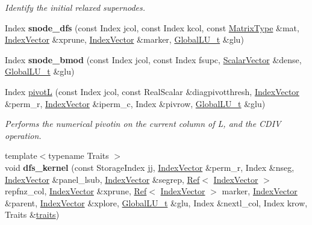 \begin{DoxyCompactItemize}
\begin{DoxyCompactList}\small\item\em Identify the initial relaxed supernodes. \end{DoxyCompactList}\item 
\mbox{\label{class_eigen_1_1internal_1_1_sparse_l_u_impl_a75c5a4b5a17643e243e11741df018470}} 
Index {\bfseries snode\+\_\+dfs} (const Index jcol, const Index kcol, const \mbox{\hyperlink{class_eigen_1_1_sparse_matrix}{Matrix\+Type}} \&mat, \mbox{\hyperlink{class_eigen_1_1_matrix}{Index\+Vector}} \&xprune, \mbox{\hyperlink{class_eigen_1_1_matrix}{Index\+Vector}} \&marker, \mbox{\hyperlink{struct_eigen_1_1internal_1_1_l_u___global_l_u__t}{Global\+L\+U\+\_\+t}} \&glu)
\item 
\mbox{\label{class_eigen_1_1internal_1_1_sparse_l_u_impl_a2d835179cc3dcf09ff14ab3c8f0d9415}} 
Index {\bfseries snode\+\_\+bmod} (const Index jcol, const Index fsupc, \mbox{\hyperlink{class_eigen_1_1_matrix}{Scalar\+Vector}} \&dense, \mbox{\hyperlink{struct_eigen_1_1internal_1_1_l_u___global_l_u__t}{Global\+L\+U\+\_\+t}} \&glu)
\item 
Index \mbox{\hyperlink{class_eigen_1_1internal_1_1_sparse_l_u_impl_ab5f56947465b829f8d523575724c3ac6}{pivotL}} (const Index jcol, const Real\+Scalar \&diagpivotthresh, \mbox{\hyperlink{class_eigen_1_1_matrix}{Index\+Vector}} \&perm\+\_\+r, \mbox{\hyperlink{class_eigen_1_1_matrix}{Index\+Vector}} \&iperm\+\_\+c, Index \&pivrow, \mbox{\hyperlink{struct_eigen_1_1internal_1_1_l_u___global_l_u__t}{Global\+L\+U\+\_\+t}} \&glu)
\begin{DoxyCompactList}\small\item\em Performs the numerical pivotin on the current column of L, and the C\+D\+IV operation. \end{DoxyCompactList}\item 
\mbox{\label{class_eigen_1_1internal_1_1_sparse_l_u_impl_aef49b896c596d9e4893d3ae468d1dfac}} 
{\footnotesize template$<$typename Traits $>$ }\\void {\bfseries dfs\+\_\+kernel} (const Storage\+Index jj, \mbox{\hyperlink{class_eigen_1_1_matrix}{Index\+Vector}} \&perm\+\_\+r, Index \&nseg, \mbox{\hyperlink{class_eigen_1_1_matrix}{Index\+Vector}} \&panel\+\_\+lsub, \mbox{\hyperlink{class_eigen_1_1_matrix}{Index\+Vector}} \&segrep, \mbox{\hyperlink{class_eigen_1_1_ref}{Ref}}$<$ \mbox{\hyperlink{class_eigen_1_1_matrix}{Index\+Vector}} $>$ repfnz\+\_\+col, \mbox{\hyperlink{class_eigen_1_1_matrix}{Index\+Vector}} \&xprune, \mbox{\hyperlink{class_eigen_1_1_ref}{Ref}}$<$ \mbox{\hyperlink{class_eigen_1_1_matrix}{Index\+Vector}} $>$ marker, \mbox{\hyperlink{class_eigen_1_1_matrix}{Index\+Vector}} \&parent, \mbox{\hyperlink{class_eigen_1_1_matrix}{Index\+Vector}} \&xplore, \mbox{\hyperlink{struct_eigen_1_1internal_1_1_l_u___global_l_u__t}{Global\+L\+U\+\_\+t}} \&glu, Index \&nextl\+\_\+col, Index krow, Traits \&\mbox{\hyperlink{struct_eigen_1_1internal_1_1traits}{traits}})

\end{DoxyCompactItemize}
